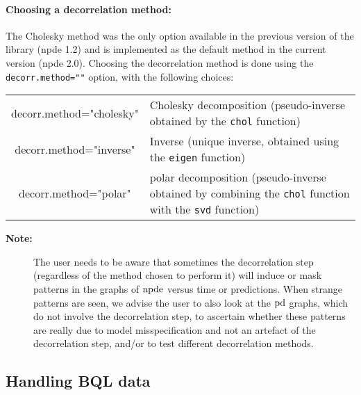 \paragraph{Choosing a decorrelation method:} The Cholesky method was the only option available in the previous version of the library (npde 1.2) and is implemented as the default method in the current version (npde 2.0). Choosing the decorrelation method is done using the \texttt{decorr.method=""} option, with the following choices:
\begin{center}
\begin{tabular}{c p{11cm}}
\hline
decorr.method="cholesky" & Cholesky decomposition (pseudo-inverse obtained by the \texttt{chol} function)\\
decorr.method="inverse" & Inverse (unique inverse, obtained using the \texttt{eigen} function)\\
decorr.method="polar" & polar decomposition (pseudo-inverse obtained by combining the \texttt{chol} function with the \texttt{svd} function)\\
\hline
\end{tabular}
\end{center}
\begin{description}
\item[{\bf Note:}] The user needs to be aware that sometimes the decorrelation step (regardless of the method chosen to perform it) will induce or mask patterns in the graphs of ${\rm npde}$ versus time or predictions. When strange patterns are seen, we advise the user to also look at the ${\rm pd}$ graphs, which do not involve the decorrelation step, to ascertain whether these patterns are really due to model misspecification and not an artefact of the decorrelation step, and/or to test different decorrelation methods.
\end{description}

\subsection{Handling BQL data} \label{sec:npdeBQL}

